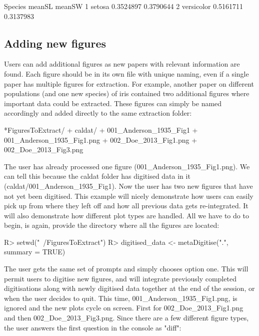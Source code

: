 \documentclass[article]{jss}
\begin{document}
\begin{CodeChunk}
\begin{CodeOutput}
     Species    meanSL    meanSW
1     setosa 0.3524897 0.3790644
2 versicolor 0.5161711 0.3137983
\end{CodeOutput}
\end{CodeChunk}



\subsection{Adding new figures}

Users can add additional figures as new papers with relevant information are found. Each figure should be in its own file with unique naming, even if a single paper has multiple figures for extraction. For example, another paper on different populations (and one new species) of iris contained two additional figures where important data could be extracted. These figures can simply be named accordingly and added directly to the same extraction folder: 

\begin{CodeChunk}
\begin{CodeOutput}
*FiguresToExtract/
	+ caldat/
	  	+ 001_Anderson_1935_Fig1
    + 001_Anderson_1935_Fig1.png
    + 002_Doe_2013_Fig1.png
    + 002_Doe_2013_Fig3.png
\end{CodeOutput}
\end{CodeChunk}

The user has already processed one figure (001\_Anderson\_1935\_Fig1.png). We can tell this because the caldat folder has digitised data in it (caldat/001\_Anderson\_1935\_Fig1). Now the user has two new figures that have not yet been digitised. This example will nicely demonstrate how users can easily pick up from where they left off and how all previous data gets re-integrated. It will also demonstrate how different plot types are handled. All we have to do to begin, is again, provide the directory where all the figures are located:

\begin{CodeChunk}
\begin{CodeInput}
R> setwd("~/FiguresToExtract")
R> digitised_data <- metaDigitise(".", summary = TRUE)
\end{CodeInput}
\end{CodeChunk}

The user gets the same set of prompts and simply chooses option one. This will permit users to digitise new figures, and will integrate previously completed digitisations along with newly digitised data together at the end of the session, or when the user decides to quit. This time, 001\_Anderson\_1935\_Fig1.png, is ignored and the new plots cycle on screen. First for 002\_Doe\_2013\_Fig1.png and then 002\_Doe\_2013\_Fig3.png. Since there are a few different figure types, the user answers the first question in the  console as "diff":
\end{document}
